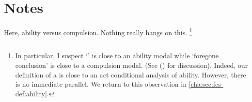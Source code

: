 \section{Notes}

\begin{note}
  \color{red}
  Here, ability versus compulsion.
  Nothing really hangs on this.%
  \footnote{
    \label{fn:fc-ability}
    In particular, I suspect `' is close to an ability modal while `foregone conclusion' is close to a compulsion modal.
    (See (\cite{Mandelkern:2017aa}) for discussion).
    Indeed, our definition of a \fc{} is close to an act conditional analysis of ability.
    However, there is no immediate parallel.
    We return to this observation in \autoref{cha:sec:fcs-def:ability}.
  }
\end{note}


